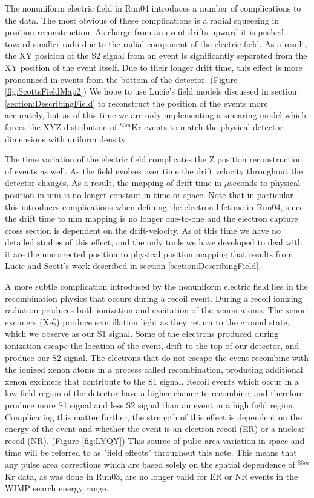 \documentclass[a4paper,12pt]{article}
\begin{document}
{The nonuniform electric field in Run04 introduces a number of complications to the data.  The most obvious of these complications is a radial squeezing in position reconstruction.  As charge from an event drifts upward it is pushed toward smaller radii due to the radial component of the electric field.  As a result, the XY position of the S2 signal from an event is significantly separated from the XY position of the event itself.  Due to their longer drift time, this effect is more pronounced in events from the bottom of the detector. (Figure \ref{fig:ScottsFieldMap2}) We hope to use Lucie's field models discussed in section \ref{section:DescribingField} to reconstruct the position of the events more accurately, but as of this time we are only implementing a smearing model which forces the XYZ distribution of $^{83m}$Kr events to match the physical detector dimensions with uniform density.  \cite{PositionRecon} 

The time variation of the electric field complicates the Z position reconstruction of events as well.  As the field evolves over time the drift velocity throughout the detector changes.  As a result, the mapping of drift time in $\mu$seconds to physical position in mm is no longer constant in time or space. Note that in particular this introduces complications when defining the electron lifetime in Run04, since the drift time to mm mapping is no longer one-to-one and the electron capture cross section is dependent on the drift-velocity. As of this time we have no detailed studies of this effect, and the only tools we have developed to deal with it are the uncorrected position to physical position mapping that results from Lucie and Scott's work described in section \ref{section:DescribingField}.  


A more subtle complication introduced by the nonuniform electric field lies in the recombination physics that occurs during a recoil event.  During a recoil ionizing radiation produces both ionization and excitation of the xenon atoms.  The xenon excimers (Xe$_2^*$) produce scintillation light as they return to the ground state, which we observe as our S1 signal. Some of the electrons produced during ionization escape the location of the event, drift to the top of our detector, and produce our S2 signal.  The electrons that do not escape the event recombine with the ionized xenon atoms in a process called recombination, producing additional xenon excimers that contribute to the S1 signal.  Recoil events which occur in a low field region of the detector have a higher chance to recombine, and therefore produce more S1 signal and less S2 signal than an event in a high field region.  Complicating this matter further, the strength of this effect is dependent on the energy of the event and whether the event is an electron recoil (ER) or a nuclear recoil (NR).  (Figure \ref{fig:LYQY})  This source of pulse area variation in space and time will be referred to as "field effects" throughout this note.  This means that any pulse area corrections which are based solely on the spatial dependence of $^{83m}$Kr data, as was done in Run03, are no longer valid for ER or NR events in the WIMP search energy range.  

}
\end{document}
